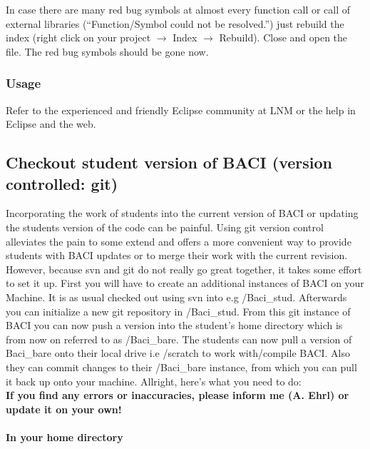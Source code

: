 In case there are many red bug symbols at almost every function call or call of
external libraries (``Function/Symbol could not be resolved.'') just rebuild the
index (right click on your project $\rightarrow$ Index $\rightarrow$ Rebuild). Close and
open the file. The red bug symbols should be gone now.

\subsubsection{Usage}

Refer to the experienced and friendly Eclipse community at LNM or the help in Eclipse and the web.

\newpage

\subsection{Checkout student version of BACI (version controlled: git)}
Incorporating the work of students into the current version of BACI or updating the students version of the code can be painful. Using git version control alleviates the pain
to some extend and offers a more convenient way to provide students with BACI updates or to merge their work with the current revision.
However, because svn and git do not really go great together, it takes some effort to set it up. First you will have to create an additional instances of BACI on your Machine. It is as usual
checked out using svn into e.g /Baci\_stud. Afterwards you can initialize a new git repository in /Baci\_stud. From this git instance
of BACI you can now push a version into the student's home directory which is from now on referred to as /Baci\_bare. The students can now pull a version of Baci\_bare onto their local 
drive i.e /scratch to work with/compile BACI. Also they can commit changes to their /Baci\_bare instance, from which you can pull it back up onto your machine.
Allright, here's what you need to do:\\

{\bf {If you find any errors or inaccuracies, please inform me (A. Ehrl) or update it on your own!}}

\paragraph{In your home directory}

